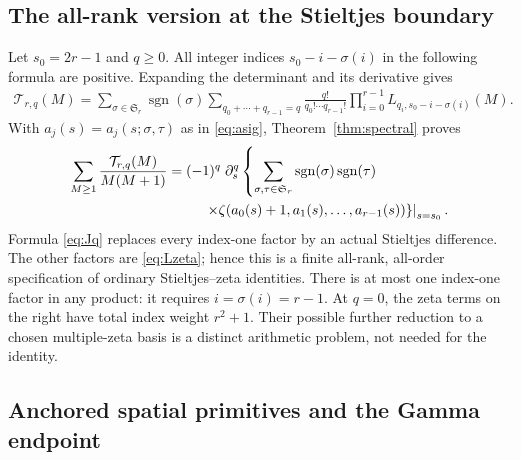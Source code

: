 \documentclass[11pt,letterpaper]{article}
\numberwithin{equation}{section}
\theoremstyle{definition}\newtheorem{definition}[theorem]{Definition}
\theoremstyle{remark}\newtheorem{remark}[theorem]{Remark}
\begin{document}
\subsection{The all-rank version at the Stieltjes boundary}

Let $s_0=2r-1$ and $q\ge0$. All integer indices
$s_0-i-\sigma(i)$ in the following formula are positive. Expanding the
determinant and its derivative gives
\begin{equation}\label{eq:rankjet}
 \begin{split}
 \mathcal T_{r,q}(M)=
 \sum_{\sigma\in\mathfrak S_r}\operatorname{sgn}(\sigma)
 \sum_{q_0+\cdots+q_{r-1}=q}
       \frac{q!}{q_0!\cdots q_{r-1}!}
       \prod_{i=0}^{r-1}L_{q_i,s_0-i-\sigma(i)}(M).
 \end{split}
\end{equation}
With $a_j(s)=a_j(s;\sigma,\tau)$ as in \eqref{eq:asig},
Theorem~\ref{thm:spectral} proves
\begin{equation}\label{eq:rankstieltjes}
 \begin{split}
 \sum_{M\ge1}\frac{\mathcal T_{r,q}(M)}{M(M+1)}
 ={}&(-1)^q\left.\partial_s^q\left\{
 \sum_{\sigma,\tau\in\mathfrak S_r}
       \operatorname{sgn}(\sigma)\operatorname{sgn}(\tau)\right.\right.\\
 &\left.\left.\hspace{4mm}\times
 \zeta(a_0(s)+1,a_1(s),\ldots,a_{r-1}(s))
 \right\}\right|_{s=s_0}.
 \end{split}
\end{equation}
Formula \eqref{eq:Jq} replaces every index-one factor by an actual
Stieltjes difference. The other factors are \eqref{eq:Lzeta}; hence
this is a finite all-rank, all-order specification of ordinary
Stieltjes--zeta identities. There is at most one index-one factor in
any product: it requires $i=\sigma(i)=r-1$. At $q=0$, the zeta terms
on the right have total index weight $r^2+1$. Their possible further
reduction to a chosen multiple-zeta basis is a distinct arithmetic
problem, not needed for the identity.

\subsection{Anchored spatial primitives and the Gamma endpoint}
\end{document}
